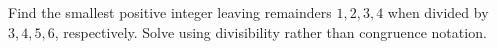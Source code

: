 Find the smallest positive integer leaving remainders $1,2,3,4$ when divided by $3,4,5,6$, respectively. Solve using divisibility rather than congruence notation.
